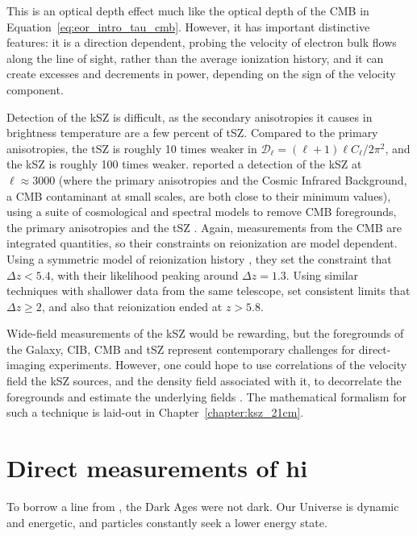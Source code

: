 This is an optical depth effect much like the optical depth of the CMB in Equation~\ref{eq:eor_intro_tau_cmb}. However, it has important distinctive features: it is a direction dependent, probing the velocity of electron bulk flows along the line of sight, rather than the average ionization history, and it can create excesses and decrements in power, depending on the sign of the velocity component.

Detection of the kSZ is difficult, as the secondary anisotropies it causes in brightness temperature are a few percent of tSZ. Compared to the primary anisotropies, the tSZ is roughly 10 times weaker in $\mathcal{D}_{\ell}=(\ell+1)\ell C_{\ell}/2\pi^2$, and the kSZ is roughly 100 times weaker.
\cite{George.15} reported a detection of the kSZ at $\ell\approx3000$ (where the primary anisotropies and the Cosmic Infrared Background, a CMB contaminant at small scales, are both close to their minimum values), using a suite of cosmological and spectral models to remove CMB foregrounds, the primary anisotropies and the tSZ \citep[e.g.][]{Shaw.10}. Again, measurements from the CMB are integrated quantities, so their constraints on reionization are model dependent. Using a symmetric model of reionization history \citep{Zahn.12}, they set the constraint that $\Delta z < 5.4$, with their likelihood peaking around $\Delta z = 1.3$. Using similar techniques with shallower data from the same telescope, \cite{Zahn.12} set consistent limits that $\Delta z \geq 2$, and also that reionization ended at $z>5.8$.

Wide-field measurements of the kSZ would be rewarding, but the foregrounds of the Galaxy, CIB, CMB and tSZ represent contemporary challenges for direct-imaging experiments. However, one could hope to use correlations of the velocity field the kSZ sources, and the density field associated with it, to decorrelate the foregrounds and estimate the underlying fields \citep[e.g.][]{Cooray.04, Alvarez.16}. The mathematical formalism for such a technique is laid-out in Chapter~\ref{chapter:ksz_21cm}.

\section{Direct measurements of {\sc hi}}
\label{sec:eor_intro_hi}

To borrow a line from \cite{DannyThesis}, the Dark Ages were not dark. Our Universe is dynamic and energetic, and particles constantly seek a lower energy state.

